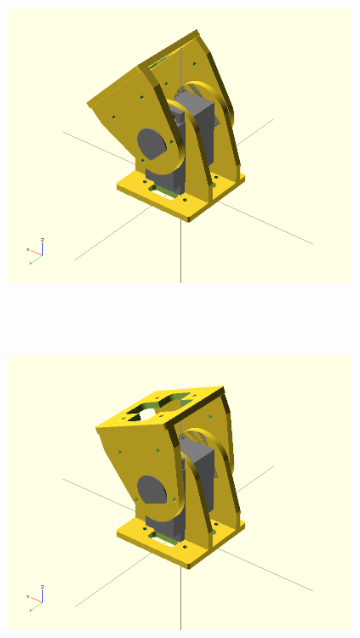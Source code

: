 \begin{figure}[h]
\begin{subfigure}[b]{0.18\textwidth}
                \label{fig:Gait_osc_center_62_5-2}
        \end{subfigure}
        ~
        \begin{subfigure}[b]{0.18\textwidth}
                \centering
                \includegraphics[width=\textwidth]{images/Gait_osc_center_45.png}
                 ~
                \label{fig:Gait_osc_center_45-2}
        \end{subfigure}
        ~
        \begin{subfigure}[b]{0.18\textwidth}
         	   \centering
                \includegraphics[width=\textwidth]{images/Gait_osc_center_62_5.png}

\end{subfigure}
\end{figure}
